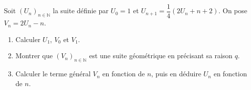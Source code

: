 \fin
{}
Soit $(U_n)_{n\in\mathbb{N}}$ la suite définie par $U_0=1$ et $U_{n+1}=\dfrac14\left(2U_n+n+2\right)$. On pose $V_n=2U_n-n$.
\begin{enumerate}
\item Calculer $U_1$, $V_0$ et $V_1$.
\item Montrer que $(V_n)_{n\in\mathbb{N}}$ est une suite géométrique en précisant sa raison $q$.
\item Calculer le terme général $V_n$ en fonction de $n$, puis en déduire $U_n$ en fonction de $n$.
\end{enumerate}
\fin
